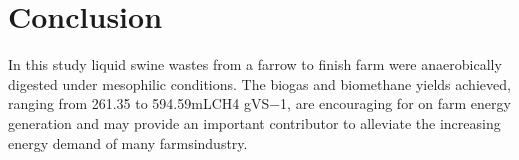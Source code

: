 \section{Conclusion}
In this study liquid swine wastes from a farrow to finish farm were anaerobically digested under mesophilic conditions. The biogas and biomethane yields achieved, ranging from 261.35 to 594.59mLCH4 gVS−1, are encouraging for on farm energy generation and may provide an important contributor to alleviate the increasing energy demand of many farmsindustry.